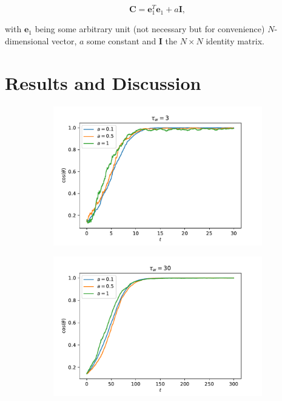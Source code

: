 \documentclass[12pt]{article}
\begin{document}
\begin{equation}
    \boldsymbol{C} = \boldsymbol{e}_1^T \boldsymbol{e}_1 + a\boldsymbol{I},
\end{equation}

with $\boldsymbol{e}_1$ being some arbitrary unit (not necessary but for convenience) $N$-dimensional vector, $a$ some constant and $\boldsymbol{I}$ the $N \times N$ identity matrix. 

\section{Results and Discussion}

\begin{figure}[ht]
  \centering
  \captionsetup{width = \textwidth}
  \begin{subfigure}[b]{0.32\textwidth}
    \includegraphics[width=\textwidth]{1.3.pdf}
    \caption{}
    \label{fig:1}
  \end{subfigure}
  \begin{subfigure}[b]{0.32\textwidth}
    \includegraphics[width=\textwidth]{1.30.pdf}

\end{subfigure}
\end{figure}
\end{document}
